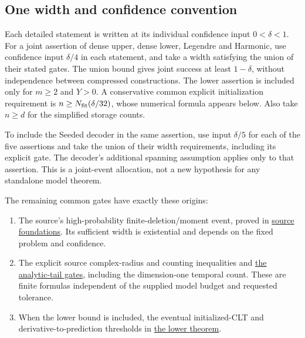 \subsection{One width and confidence convention}



Each detailed statement is written at its individual confidence input \(0<\delta<1\). For a joint assertion of dense upper, dense lower, Legendre and Harmonic, use confidence input \(\delta/4\) in each statement, and take a width satisfying the union of their stated gates. The union bound gives joint success at least \(1-\delta\), without independence between compressed constructions. The lower assertion is included only for \(m\ge2\) and \(Y>0\). A conservative common explicit initialization requirement is \(n\ge N_{\rm fit}(\delta/32)\), whose numerical formula appears below. Also take \(n\ge d\) for the simplified storage counts.



To include the Seeded decoder in the same assertion, use input \(\delta/5\) for each of the five assertions and take the union of their width requirements, including its explicit gate. The decoder's additional spanning assumption applies only to that assertion. This is a joint-event allocation, not a new hypothesis for any standalone model theorem.



The remaining common gates have exactly these origins:


\begin{enumerate}
\item[1.] The source's high-probability finite-deletion/moment event, proved in \hyperref[int:source-foundations]{source foundations}. Its sufficient width is existential and depends on the fixed problem and confidence.
\item[2.] The explicit source complex-radius and counting inequalities and \hyperref[int:harmonic-storage-count]{the analytic-tail gates}, including the dimension-one temporal count. These are finite formulas independent of the supplied model budget and requested tolerance.
\item[3.] When the lower bound is included, the eventual initialized-CLT and derivative-to-prediction thresholds in \hyperref[int:dense-trajectory-lower]{the lower theorem}.
\end{enumerate}

